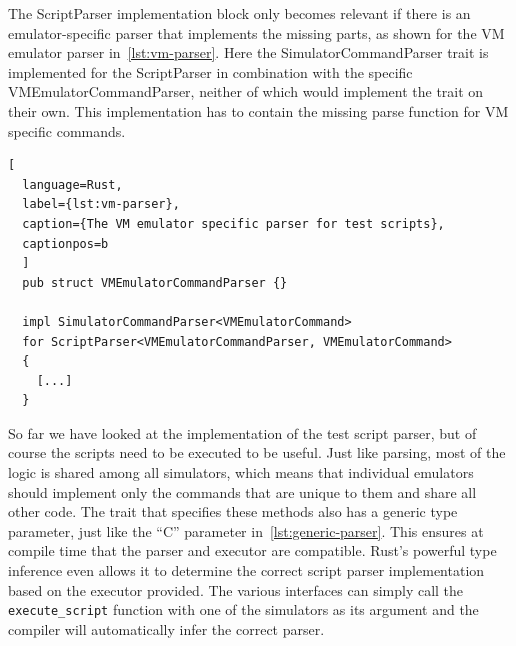 The ScriptParser implementation block only becomes relevant if there is an emulator-specific parser that implements the missing parts, as shown for the VM emulator parser in~\cref{lst:vm-parser}.
Here the SimulatorCommandParser trait is implemented for the ScriptParser in combination with the specific VMEmulatorCommandParser, neither of which would implement the trait on their own.
This implementation has to contain the missing parse function for VM specific commands.

\begin{lstlisting}[
  language=Rust,
  label={lst:vm-parser},
  caption={The VM emulator specific parser for test scripts},
  captionpos=b
  ]
  pub struct VMEmulatorCommandParser {}

  impl SimulatorCommandParser<VMEmulatorCommand>
  for ScriptParser<VMEmulatorCommandParser, VMEmulatorCommand>
  {
    [...]
  }
\end{lstlisting}

So far we have looked at the implementation of the test script parser, but of course the scripts need to be executed to be useful.
Just like parsing, most of the logic is shared among all simulators, which means that individual emulators should implement only the commands that are unique to them and share all other code.
The trait that specifies these methods also has a generic type parameter, just like the ``C'' parameter in~\cref{lst:generic-parser}.
This ensures at compile time that the parser and executor are compatible.
Rust's powerful type inference even allows it to determine the correct script parser implementation based on the executor provided.
The various interfaces can simply call the \verb+execute_script+ function with one of the simulators as its argument and the compiler will automatically infer the correct parser.


